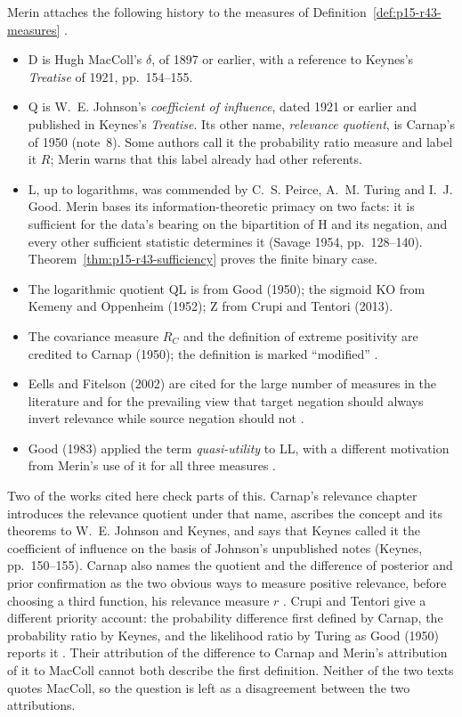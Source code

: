 Merin attaches the following history to the measures of
Definition~\ref{def:p15-r43-measures}
\cite[pp.~270, 272--273 and p.~274, n.~8]{Merin2021Relevance}.
\begin{itemize}
\item D is Hugh MacColl's \(\delta\), of 1897 or earlier, with a
  reference to Keynes's \emph{Treatise} of 1921, pp.~154--155.
\item Q is W.~E. Johnson's \emph{coefficient of influence}, dated 1921
  or earlier and published in Keynes's \emph{Treatise}. Its other name,
  \emph{relevance quotient}, is Carnap's of 1950 (note~8). Some authors
  call it the probability ratio measure and label it \(R\); Merin warns
  that this label already had other referents.
\item L, up to logarithms, was commended by C.~S. Peirce, A.~M. Turing
  and I.~J. Good. Merin bases its information-theoretic primacy on two
  facts: it is sufficient for the data's bearing on the bipartition of
  H and its negation, and every other sufficient statistic determines
  it (Savage 1954, pp.~128--140).
  Theorem~\ref{thm:p15-r43-sufficiency} proves the finite binary case.
\item The logarithmic quotient QL is from Good (1950); the sigmoid KO
  from Kemeny and Oppenheim (1952); Z from Crupi and Tentori (2013).
\item The covariance measure \(R_C\) and the definition of extreme
  positivity are credited to Carnap (1950); the definition is marked
  ``modified'' \cite[pp.~266, 272]{Merin2021Relevance}.
\item Eells and Fitelson (2002) are cited for the large number of
  measures in the literature and for the prevailing view that target
  negation should always invert relevance while source negation should
  not \cite[pp.~269, 272]{Merin2021Relevance}.
\item Good (1983) applied the term \emph{quasi-utility} to LL, with a
  different motivation from Merin's use of it for all three measures
  \cite[p.~273]{Merin2021Relevance}.
\end{itemize}

Two of the works cited here check parts of this. Carnap's relevance chapter
introduces the relevance quotient under that name, ascribes the concept
and its theorems to W.~E. Johnson and Keynes, and says that Keynes
called it the coefficient of influence on the basis of Johnson's
unpublished notes (Keynes, pp.~150--155). Carnap also names the
quotient and the difference of posterior and prior confirmation as the
two obvious ways to measure positive relevance, before choosing a third
function, his relevance measure \(r\)
\cite[\S66, pp.~356--357; \S67, p.~362]{Carnap1950Probability}.
Crupi and Tentori give a different priority account: the probability
difference first defined by Carnap, the probability ratio by Keynes,
and the likelihood ratio by Turing as Good (1950) reports it
\cite[p.~654, n.~5]{CrupiTentori2016Confirmation}. Their attribution
of the difference to Carnap and Merin's attribution of it to MacColl
cannot both describe the first definition. Neither of the two texts quotes
MacColl, so the question is left as a disagreement between the two
attributions.

